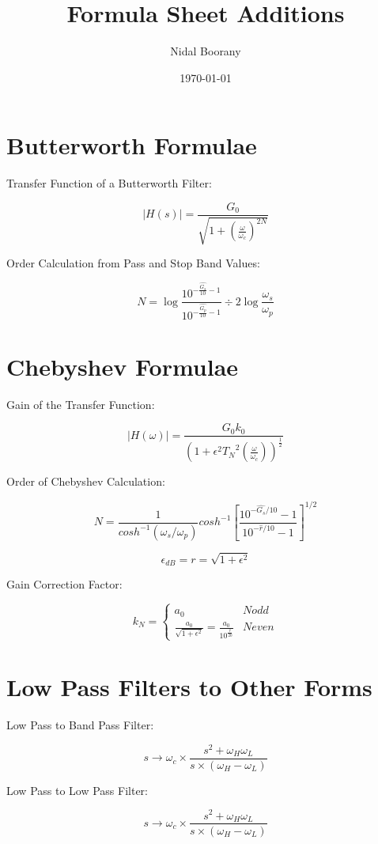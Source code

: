 \documentclass{article}
\begin{document}
\title{Formula Sheet Additions}
\author{Nidal Boorany}
\date{\today}
\maketitle

\section{Butterworth Formulae}
Transfer Function of a Butterworth Filter:

$$|H(s)| = \frac{G_0}{\sqrt{1 + (\frac{\omega}{\omega_c})^{2N}}}$$

Order Calculation from Pass and Stop Band Values:

$$N = \log{\frac{10^{- \frac{\hat{G_s}}{10} - 1}}{10^{- \frac{\hat{G_p}}{ 10} - 1}}} \div {2 \log{\frac{\omega_s}{\omega_p}}}$$

\section{Chebyshev Formulae}

Gain of the Transfer Function:

$$|H(\omega)| = \frac{{G_0} {k_0}}{(1 + {\epsilon}^2 {T_N}^2(\frac{\omega}{\omega_c}))^{\frac{1}{2}}}$$

Order of Chebyshev Calculation:

$$N = \frac{1}{cosh^{-1}(\omega_{s}/\omega_{p})}cosh^{-1}\left[\frac{10^{-\hat{G_{s}}/10}-1}{10^{-\hat{r}/10}-1}\right]^{1/2}$$

$$\epsilon_{dB} = r = \sqrt{1 + \epsilon^{2}}$$

Gain Correction Factor:

$$k_N = \begin{cases} 
    a_0 & N odd\\ 
    \frac{a_0}{\sqrt{1+ \epsilon^2}} = \frac{a_0}{10^{\frac{\hat{r}}{20}}} & N even
\end{cases}
$$

\section{Low Pass Filters to Other Forms}

Low Pass to Band Pass Filter:

$$s \rightarrow \omega_c \times \frac{s^2 + \omega_H \omega_L}{s\times (\omega_H - \omega_L)}$$

Low Pass to Low Pass Filter:

$$s \rightarrow \omega_c \times \frac{s^2+\omega_H \omega_L}{s \times(\omega_H - \omega_L)}$$
\end{document}

